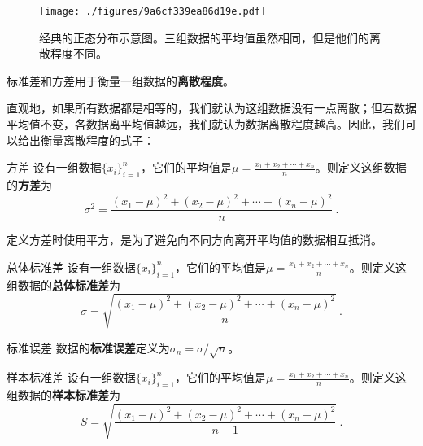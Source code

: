 


\begin{figure}[ht]
\centering
\texttt{[image: ./figures/9a6cf339ea86d19e.pdf]}
\caption{经典的正态分布示意图。三组数据的平均值虽然相同，但是他们的离散程度不同。} \label{fig_StDevi_1}
\end{figure}

标准差和方差用于衡量一组数据的\textbf{离散程度}。

直观地，如果所有数据都是相等的，我们就认为这组数据没有一点离散；但若数据平均值不变，各数据离平均值越远，我们就认为数据离散程度越高。因此，我们可以给出衡量离散程度的式子：

\begin{definition}{方差}\label{def_StDevi_1}
设有一组数据$\{x_i\}_{i=1}^n$，它们的平均值是$\mu=\frac{x_1+x_2+\cdots+x_n}{n}$。则定义这组数据的\textbf{方差}为
\begin{equation}\label{eq_StDevi_1}
\sigma^2 = \frac{(x_1-\mu)^2+(x_2-\mu)^2+\cdots+(x_n-\mu)^2}{n}~.
\end{equation}
\end{definition}

定义方差时使用平方，是为了避免向不同方向离开平均值的数据相互抵消。

\begin{definition}{总体标准差}
设有一组数据$\{x_i\}_{i=1}^n$，它们的平均值是$\mu=\frac{x_1+x_2+\cdots+x_n}{n}$。则定义这组数据的\textbf{总体标准差}为
\begin{equation}
\sigma = \sqrt{\frac{(x_1-\mu)^2+(x_2-\mu)^2+\cdots+(x_n-\mu)^2}{n}}~.
\end{equation}
\end{definition}

\begin{definition}{标准误差}
数据的\textbf{标准误差}定义为$\sigma_n=\sigma/\sqrt{n}$。
\end{definition}





\begin{definition}{样本标准差}
设有一组数据$\{x_i\}_{i=1}^n$，它们的平均值是$\mu=\frac{x_1+x_2+\cdots+x_n}{n}$。则定义这组数据的\textbf{样本标准差}为
\begin{equation}
S = \sqrt{\frac{(x_1-\mu)^2+(x_2-\mu)^2+\cdots+(x_n-\mu)^2}{n-1}}~.
\end{equation}
\end{definition}


